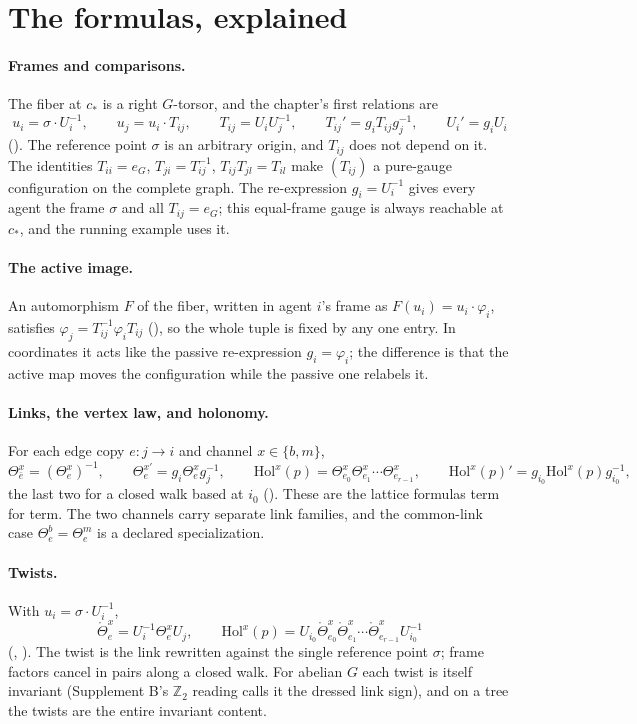 \section{The formulas, explained}
\label{comp:ch02-formulas}

\paragraph{Frames and comparisons.}
The fiber at $c_*$ is a right $G$-torsor, and the chapter's first relations are
\[
u_i=\sigma\cdot U_i^{-1},
\qquad
u_j=u_i\cdot T_{ij},
\qquad
T_{ij}=U_iU_j^{-1},
\qquad
T_{ij}'=g_iT_{ij}g_j^{-1},
\qquad
U_i'=g_iU_i
\]
(). The reference point $\sigma$ is an arbitrary origin, and $T_{ij}$ does not
depend on it. The identities $T_{ii}=e_G$, $T_{ji}=T_{ij}^{-1}$, $T_{ij}T_{jl}=T_{il}$ make $(T_{ij})$ a pure-gauge
configuration on the complete graph. The re-expression $g_i=U_i^{-1}$ gives every agent the frame $\sigma$ and
all $T_{ij}=e_G$; this equal-frame gauge is always reachable at $c_*$, and the running example uses it.

\paragraph{The active image.}
An automorphism $F$ of the fiber, written in agent $i$'s frame as $F(u_i)=u_i\cdot\varphi_i$, satisfies
$\varphi_j=T_{ij}^{-1}\varphi_iT_{ij}$ (), so the whole tuple is fixed by any one
entry. In coordinates it acts like the passive re-expression $g_i=\varphi_i$; the difference is that the active
map moves the configuration while the passive one relabels it.

\paragraph{Links, the vertex law, and holonomy.}
For each edge copy $e:j\to i$ and channel $x\in\{b,m\}$,
\[
\Theta_{\bar e}^x=(\Theta_e^x)^{-1},
\qquad
\Theta_e^{x\prime}=g_i\Theta_e^xg_j^{-1},
\qquad
\mathrm{Hol}^x(p)=\Theta_{e_0}^x\Theta_{e_1}^x\cdots\Theta_{e_{r-1}}^x,
\qquad
\mathrm{Hol}^x(p)'=g_{i_0}\mathrm{Hol}^x(p)g_{i_0}^{-1},
\]
the last two for a closed walk based at $i_0$ (). These are the lattice formulas term
for term. The two channels carry separate link families, and the common-link case $\Theta_e^b=\Theta_e^m$ is a
declared specialization.

\paragraph{Twists.}
With $u_i=\sigma\cdot U_i^{-1}$,
\[
\mathring\Theta_e^x=U_i^{-1}\Theta_e^xU_j,
\qquad
\mathrm{Hol}^x(p)=U_{i_0}\mathring\Theta_{e_0}^x\mathring\Theta_{e_1}^x\cdots\mathring\Theta_{e_{r-1}}^xU_{i_0}^{-1}
\]
(, ). The twist is the link rewritten against the
single reference point $\sigma$; frame factors cancel in pairs along a closed walk. For abelian $G$ each twist is
itself invariant (Supplement B's $\mathbb Z_2$ reading calls it the dressed link sign), and on a tree the twists
are the entire invariant content.

